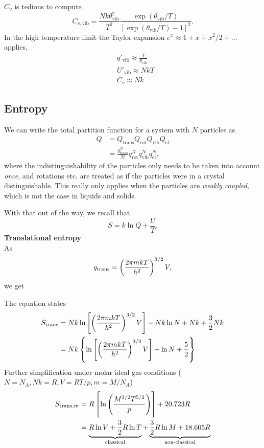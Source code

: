 $C_v$ is tedious to compute
\begin{equation}
	C_{v,\text{vib}}=\frac{Nk\theta_{\text{vib}}^2}{T^2}\frac{\exp(\theta_{\text{vib}}/T)}{[\exp(\theta_{\text{vib}}/T)-1]^2}.
\end{equation}
In the high temperature limit the Taylor expansion $e^x\approx 1+x+x^2/2+\dots $ applies,
\begin{equation}
\begin{aligned}
	&q'_{\text{vib}}\approx\frac{T}{\theta_{\text{vib}}}\\
	&U'_{\text{vib}}\approx NkT\\
	&C_v\approx Nk
\end{aligned}
\end{equation}


\subsection{Entropy}
We can write the total partition function for a system with $N$ particles as
\begin{equation}
\begin{aligned}
	Q&=Q_{\text{trans}}Q_{\text{rot}}Q_{\text{vib}}Q_{\text{el}}\\
	&=\frac{q^N_{\text{trans}}}{N!}q_{\text{rot}}^Nq_{\text{vib}}^Nq_{\text{el}}^N,
\end{aligned}
\end{equation}
where the indistinguishability of the particles only needs to be taken into account \emph{once}, and rotations etc. are treated as if the particles were in a crystal \ie distinguishable. This really only applies when the particles are \emph{weakly coupled}, which is not the case in liquids and solids. \par
With that out of the way, we recall that
\begin{equation}
	S=k\ln Q+\frac{U}{T}.
\end{equation}
\textbf{Translational entropy}\\
As
\begin{equation}
	q_{\text{trans}}=\left(\frac{2\pi mkT}{h^2} \right)^{3/2}V,
\end{equation}
we get
\begin{thrm}
The equation states
\begin{equation}
\begin{aligned}
		S_{\text{trans}}&=Nk\ln\left[\left(\frac{2\pi mkT}{h^2} \right)^{3/2}V \right]-Nk\ln N+Nk+\frac{3}{2}Nk\\
		&=Nk\left\{\ln\left[\left(\frac{2\pi mkT}{h^2} \right)^{3/2}V \right]-\ln N+\frac{5}{2} \right\}
\end{aligned}
\end{equation}
Further simplification under molar ideal gas conditions ($N=N_A,Nk=R,V=RT/p,m=M/N_A$)
\begin{equation}
\begin{aligned}
	S_{\text{trans},m}&=R\left[\ln\left(\frac{M^{3/2}T^{5/2}}{p} \right) \right]+20.723R\\
	&=\underbrace{R\ln V+\frac{3}{2}R\ln T}_{\text{classical}}+\underbrace{\frac{3}{2}R\ln M+18.605R}_{\text{non-classical}}
\end{aligned}
\end{equation}
\end{thrm}
